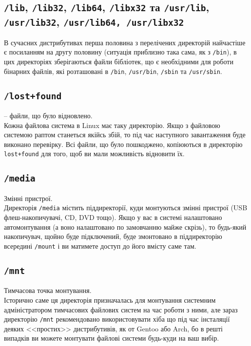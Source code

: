 \documentclass[10pt,a4paper]{fancyhandout}
\begin{document}
	\subsection{\texttt{/lib}, \texttt{/lib32}, \texttt{/lib64}, \texttt{/libx32} та \texttt{/usr/lib}, \texttt{/usr/lib32}, \texttt{/usr/lib64, \texttt{/usr/libx32}}}
	В сучасних дистрибутивах перша половина з перелічених директорій найчастіше є посиланням на другу половину (ситуація приблизно така сама, як з \texttt{/bin}), в цих директоріях зберігаються файли бібліотек, що є необхідними для роботи бінарних файлів, які розташовані в \texttt{/bin}, \texttt{/usr/bin}, \texttt{/sbin} та \texttt{/usr/sbin}.
	\goodbreak
	
	\subsection{\texttt{/lost+found}} -- файли, що було відновлено. \\
	Кожна файлова система в Linux має таку директорію. Якщо з файловою системою раптом станеться якійсь збій, то під час наступного завантаження буде виконано перевірку. Всі файли, що було пошкоджено, копіюються в директорію \texttt{lost+found} для того, щоб ви мали можливість відновити їх.
	\goodbreak
	
	\subsection{\texttt{/media}}
	Змінні пристрої. \\
	Директорія \texttt{/media} містить піддиректорії, куди монтуються змінні пристрої (USB флеш-накопичувачі, CD, DVD тощо). Якщо у вас в системі налаштовано автомонтування (а воно налаштовано по замовчанню майже скрізь), то будь-який накопичувач, щойно буде підключений, буде змонтовано в піддиректорію всередині \texttt{/mount} і ви матимете доступ до його вмісту саме там.
	\goodbreak
	
	\subsection{\texttt{/mnt}}
	Тимчасова точка монтування. \\
	Історично саме ця директорія призначалась для монтування системним адміністратором тимчасових файлових систем на час роботи з ними, але зараз директорію \texttt{/mnt} рекомендовано використовувати хіба що під час інсталяції деяких <<простих>> дистрибутивів, як от Gentoo або Arch, бо в решті випадків ви можете монтувати файлові системи будь-куди на ваш вибір.
	\goodbreak
	
\end{document}
